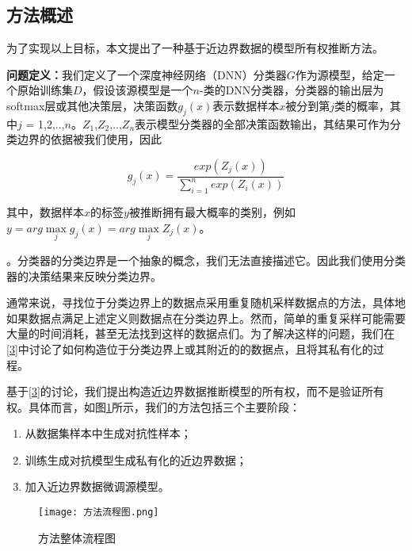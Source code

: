 \subsection{方法概述}

为了实现以上目标，本文提出了一种基于近边界数据的模型所有权推断方法。

\noindent\textbf{问题定义：}我们定义了一个深度神经网络（DNN）分类器$G$作为源模型，给定一个原始训练集$D$，假设该源模型是一个$n$-类的DNN分类器，分类器的输出层为softmax层或其他决策层，决策函数$g_j(x)$表示数据样本$x$被分到第$j$类的概率，其中$j$ = 1,2,..,$n$。$Z_1$,$Z_2$,..,$Z_n$表示模型分类器的全部决策函数输出，其结果可作为分类边界的依据被我们使用，因此

\begin{equation}
	g_j(x) = \frac{exp(Z_j(x))}{\sum_{i = 1}^n exp(Z_i(x))}
\end{equation}

\noindent 其中，数据样本$x$的标签$y$被推断拥有最大概率的类别，例如$y = arg \mathop{max} \limits_j g_j(x) = arg \mathop{max} \limits_j Z_j(x)$。

\begin{myDef}
	\label{def:2}
	。分类器的分类边界是一个抽象的概念，我们无法直接描述它。因此我们使用分类器的决策结果来反映分类边界。
\end{myDef}

通常来说，寻找位于分类边界上的数据点采用重复随机采样数据点的方法，具体地如果数据点满足上述定义则数据点在分类边界上。然而，简单的重复采样可能需要大量的时间消耗，甚至无法找到这样的数据点们。为了解决这样的问题，我们在\ref{3}中讨论了如何构造位于分类边界上或其附近的的数据点，且将其私有化的过程。

基于\ref{3}的讨论，我们提出构造近边界数据推断模型的所有权，而不是验证所有权。具体而言，如图\ref{方法流程图}所示，我们的方法包括三个主要阶段：
\begin{enumerate}
	\renewcommand{\labelenumi}{\theenumi)}
	\item 从数据集样本中生成对抗性样本；
	\item 训练生成对抗模型生成私有化的近边界数据；
	\item 加入近边界数据微调源模型。
\end{enumerate}

\begin{figure}[htbp]%
	\centering
	\texttt{[image: 方法流程图.png]}
	\setlength{\abovecaptionskip}{5mm} %
	\caption{方法整体流程图}
	\label{方法流程图}
\end {figure}

